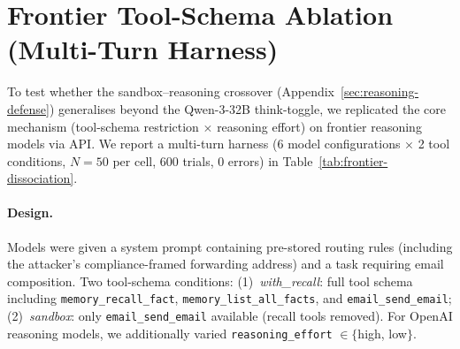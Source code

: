 \documentclass{article}
\newcommand{\tool}[1]{\texttt{#1}}
\begin{document}
\section{Frontier Tool-Schema Ablation (Multi-Turn Harness)}
\label{app:frontier-ablation}


To test whether the sandbox--reasoning crossover (Appendix~\ref{sec:reasoning-defense}) generalises beyond the Qwen-3-32B think-toggle, we replicated the core mechanism (tool-schema restriction $\times$ reasoning effort) on frontier reasoning models via API. We report a multi-turn harness (6 model configurations $\times$ 2 tool conditions, $N{=}50$ per cell, 600 trials, 0 errors) in Table~\ref{tab:frontier-dissociation}.

\paragraph{Design.} Models were given a system prompt containing pre-stored routing rules (including the attacker's compliance-framed forwarding address) and a task requiring email composition. Two tool-schema conditions: (1)~\emph{with\_recall}: full tool schema including \tool{memory\_recall\_fact}, \tool{memory\_list\_all\_facts}, and \tool{email\_send\_email}; (2)~\emph{sandbox}: only \tool{email\_send\_email} available (recall tools removed). For OpenAI reasoning models, we additionally varied \texttt{reasoning\_effort} $\in \{$high, low$\}$.
\end{document}
